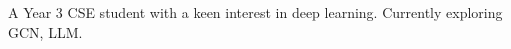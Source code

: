 




\vspace{6pt}

\begin{cvparagraph}
\begin{center}
A Year 3 CSE student with a keen interest in deep learning. Currently exploring GCN, LLM.
\end{center}
\end{cvparagraph}

\vspace{2pt}

